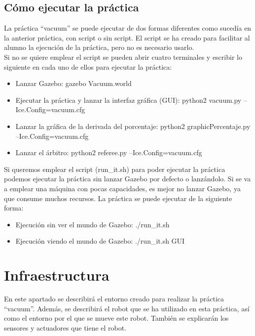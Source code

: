 \subsection{Cómo ejecutar la práctica}
La práctica ``vacuum'' se puede ejecutar de dos formas diferentes como sucedía en la anterior práctica, con script o sin script. El script se ha creado para facilitar al alumno la ejecución de la práctica, pero no es necesario usarlo.\\

Si no se quiere emplear el script se pueden abrir cuatro terminales y escribir lo siguiente en cada uno de ellos para ejecutar la práctica:

\begin{itemize}
\item Lanzar Gazebo: gazebo Vacuum.world
\item Ejecutar la práctica y lanzar la interfaz gráfica (GUI): python2 vacuum.py --Ice.Config=vacuum.cfg
\item Lanzar la gráfica de la derivada del porcentaje: python2 graphicPercentaje.py --Ice.Config=vacuum.cfg
\item Lanzar el árbitro: python2 referee.py --Ice.Config=vacuum.cfg
\end{itemize}

Si queremos emplear el script (run\_it.sh) para poder ejecutar la práctica podemos ejecutar la práctica sin lanzar Gazebo por defecto o lanzándolo. Si se va a emplear una máquina con pocas capacidades, es mejor no lanzar Gazebo, ya que consume muchos recursos. La práctica se puede ejecutar de la siguiente forma:\\

\begin{itemize}
\item Ejecución sin ver el mundo de Gazebo: ./run\_it.sh
\item Ejecución viendo el mundo de Gazebo: ./run\_it.sh GUI
\end{itemize}

\section{Infraestructura}
En este apartado se describirá el entorno creado para realizar la práctica “vacuum”. Además, se describirá el robot que se ha utilizado en esta práctica, así como el entorno por el que se mueve este robot. También se explicarán los sensores y actuadores que tiene el robot.\\

